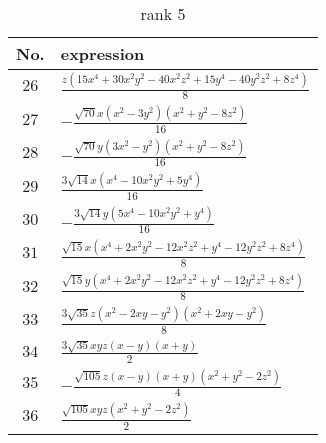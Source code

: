 \documentclass[fleqn,8pt,landscape]{jsarticle}
\begin{document}
\begin{table}[ht!]
\begin{center}
\caption{rank 5}
\renewcommand{\arraystretch}{1.3}
\begin{tabular}{cl} \hline \hline
No. & expression \\ \hline
$ 26 $ & $ \frac{z \left(15 x^{4} + 30 x^{2} y^{2} - 40 x^{2} z^{2} + 15 y^{4} - 40 y^{2} z^{2} + 8 z^{4}\right)}{8} $ \\
$ 27 $ & $ - \frac{\sqrt{70} x \left(x^{2} - 3 y^{2}\right) \left(x^{2} + y^{2} - 8 z^{2}\right)}{16} $ \\
$ 28 $ & $ - \frac{\sqrt{70} y \left(3 x^{2} - y^{2}\right) \left(x^{2} + y^{2} - 8 z^{2}\right)}{16} $ \\
$ 29 $ & $ \frac{3 \sqrt{14} x \left(x^{4} - 10 x^{2} y^{2} + 5 y^{4}\right)}{16} $ \\
$ 30 $ & $ - \frac{3 \sqrt{14} y \left(5 x^{4} - 10 x^{2} y^{2} + y^{4}\right)}{16} $ \\
$ 31 $ & $ \frac{\sqrt{15} x \left(x^{4} + 2 x^{2} y^{2} - 12 x^{2} z^{2} + y^{4} - 12 y^{2} z^{2} + 8 z^{4}\right)}{8} $ \\
$ 32 $ & $ \frac{\sqrt{15} y \left(x^{4} + 2 x^{2} y^{2} - 12 x^{2} z^{2} + y^{4} - 12 y^{2} z^{2} + 8 z^{4}\right)}{8} $ \\
$ 33 $ & $ \frac{3 \sqrt{35} z \left(x^{2} - 2 x y - y^{2}\right) \left(x^{2} + 2 x y - y^{2}\right)}{8} $ \\
$ 34 $ & $ \frac{3 \sqrt{35} x y z \left(x - y\right) \left(x + y\right)}{2} $ \\
$ 35 $ & $ - \frac{\sqrt{105} z \left(x - y\right) \left(x + y\right) \left(x^{2} + y^{2} - 2 z^{2}\right)}{4} $ \\
$ 36 $ & $ \frac{\sqrt{105} x y z \left(x^{2} + y^{2} - 2 z^{2}\right)}{2} $ \\
 \hline \hline
\end{tabular}
\end{center}
\end{table}
\end{document}
